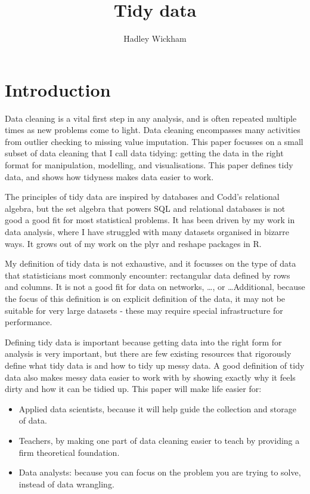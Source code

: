 \documentclass[oneside]{article}
\title{Tidy data}
\author{Hadley Wickham}
\begin{document}
\maketitle

\section{Introduction}

Data cleaning is a vital first step in any analysis, and is often repeated multiple times as new problems come to light. Data cleaning encompasses many activities from outlier checking to missing value imputation. This paper focusses on a small subset of data cleaning that I call data tidying: getting the data in the right format for  manipulation, modelling, and visualisations. This paper defines tidy data, and shows how tidyness makes data easier to work. 

The principles of tidy data are inspired by databases and Codd's relational algebra, but the set algebra that powers SQL and relational databases is not good a good fit for most statistical problems. It has been driven by my work in data analysis, where I have struggled with many datasets organised in bizarre ways. It grows out of my work on the plyr \citep{me:plyr} and reshape \citep{wickham:2007b} packages in R.

My definition of tidy data is not exhaustive, and it focusses on the type of data that statisticians most commonly encounter: rectangular data defined by rows and columns. It is not a good fit for data on networks, \ldots, or \ldots Additional, because the focus of this definition is on explicit definition of the data, it may not be suitable for very large datasets - these may require special infrastructure for performance.

Defining tidy data is important because getting data into the right form for analysis is very important, but there are few existing resources that rigorously define what tidy data is and how to tidy up messy data. A good definition of tidy data also makes messy data easier to work with by showing exactly why it feels dirty and how it can be tidied up. This paper will make life easier for:

\begin{itemize}

\item Applied data scientists, because it will help guide the collection and storage of data.

\item Teachers, by making one part of data cleaning easier to teach by providing a firm theoretical foundation.

\item Data analysts: because you can focus on the problem you are trying to solve, instead of data wrangling.

\end{itemize}
\end{document}
